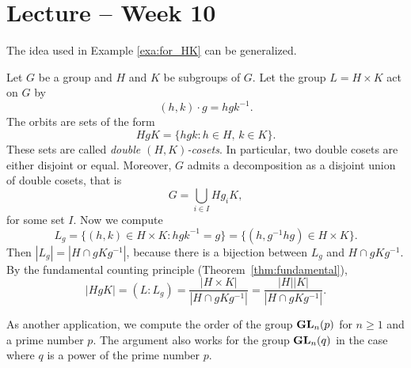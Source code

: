 \section{Lecture -- Week 10}


The idea used in Example \ref{exa:for_HK} can be generalized. 

\begin{optional}
\begin{example}
Let $G$ be a group and $H$ and $K$ be subgroups of $G$. Let the group $L=H\times K$ act on $G$ by
\[
(h,k)\cdot g=hgk^{-1}.
\]
The orbits are sets of the form 
\[
HgK=\{hgk:h\in H,\,k\in K\}.
\]
These sets are called \emph{double $(H,K)$-cosets}. 
In particular, two double cosets are either disjoint 
or equal. Moreover, $G$ admits a decomposition 
as a disjoint union of double cosets, that is 
\[
G=\bigcup_{i\in I}Hg_iK,
\]
for some set $I$. Now we compute 
\[
L_g=\{(h,k)\in H\times K:hgk^{-1}=g\}=\{(h,g^{-1}hg)\in H\times K\}.
\]
Then $|L_g|=|H\cap gKg^{-1}|$, because there is a bijection between $L_g$ and
$H\cap gKg^{-1}$. By the fundamental counting principle (Theorem~\ref{thm:fundamental}), 
\[
|HgK|=(L:L_g)=\frac{|H\times K|}{|H\cap gKg^{-1}|}=\frac{|H||K|}{|H\cap gKg^{-1}|}.
\]
\end{example}
\end{optional}

As another application, we compute the
order of the group $\mathbf{GL}_n(p)$ for $n\geq1$ and 
a prime number $p$. 
The argument also works for
the group $\mathbf{GL}_n(q)$ in the case where
$q$ is a power of the prime number $p$.

